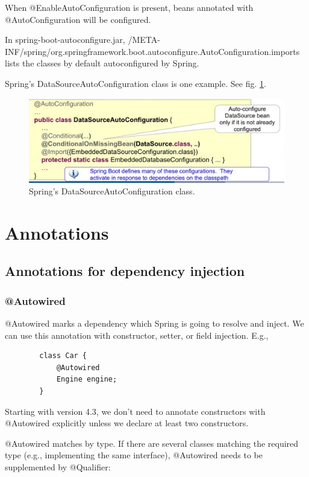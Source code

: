 \documentclass{scrartcl}
\begin{document}
    When @EnableAutoConfiguration is present, beans annotated with @AutoConfiguration  will be configured.

    In spring-boot-autoconfigure.jar, /META-INF/spring/org.springframework.boot.autoconfigure.AutoConfiguration.imports lists the classes by default autoconfigured by Spring.

    Spring's DataSourceAutoConfiguration class is one example. See fig. \ref{fig:datasourceautoconfiguration}.

    \begin{figure}
    \centering
    \includegraphics[width=1\linewidth]{datasourceautoconfiguration}
    \caption{Spring's DataSourceAutoConfiguration class.}
    \label{fig:datasourceautoconfiguration}
    \end{figure}


\section{Annotations}
\subsection{Annotations for dependency injection}
\subsubsection{@Autowired}
    @Autowired marks a dependency which Spring is going to resolve and inject. We can use this annotation with constructor, setter, or field injection. E.g.,

    \begin{lstlisting}
        class Car {
            @Autowired
            Engine engine;
        }
    \end{lstlisting}

    Starting with version 4.3, we don’t need to annotate constructors with @Autowired explicitly unless we declare at least two constructors.

    @Autowired matches by type. If there are several classes matching the required type (e.g., implementing the same interface), @Autowired needs to be supplemented by @Qualifier:
\end{document}
